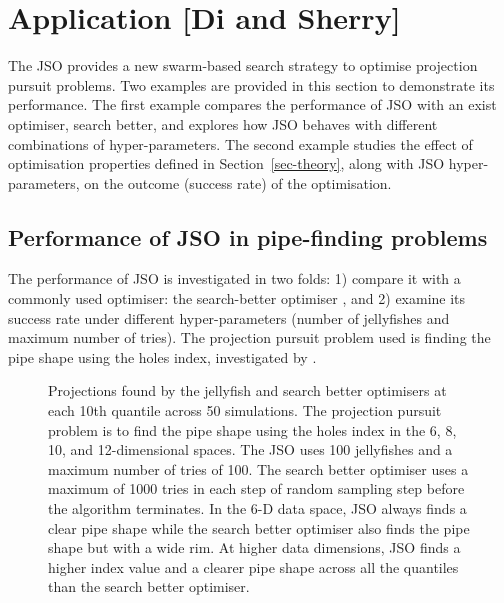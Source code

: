 \documentclass[
  number,
  preprint,
  3p]{elsarticle}
\begin{document}
\section{Application {[}Di and Sherry{]}}\label{sec-app}

The JSO provides a new swarm-based search strategy to optimise
projection pursuit problems. Two examples are provided in this section
to demonstrate its performance. The first example compares the
performance of JSO with an exist optimiser, search better, and explores
how JSO behaves with different combinations of hyper-parameters. The
second example studies the effect of optimisation properties defined in
Section~\ref{sec-theory}, along with JSO hyper-parameters, on the
outcome (success rate) of the optimisation.

\subsection{Performance of JSO in pipe-finding
problems}\label{sec-app-1}

The performance of JSO is investigated in two folds: 1) compare it with
a commonly used optimiser: the search-better optimiser
\citep{RJ-2021-105, laa_using_2020}, and 2) examine its success rate
under different hyper-parameters (number of jellyfishes and maximum
number of tries). The projection pursuit problem used is finding the
pipe shape using the holes index, investigated by
\citet{laa_using_2020}.

\begin{figure}


\caption{\label{fig-proj}Projections found by the jellyfish and search
better optimisers at each 10th quantile across 50 simulations. The
projection pursuit problem is to find the pipe shape using the holes
index in the 6, 8, 10, and 12-dimensional spaces. The JSO uses 100
jellyfishes and a maximum number of tries of 100. The search better
optimiser uses a maximum of 1000 tries in each step of random sampling
step before the algorithm terminates. In the 6-D data space, JSO always
finds a clear pipe shape while the search better optimiser also finds
the pipe shape but with a wide rim. At higher data dimensions, JSO finds
a higher index value and a clearer pipe shape across all the quantiles
than the search better optimiser.}

\end{figure}%
\end{document}
